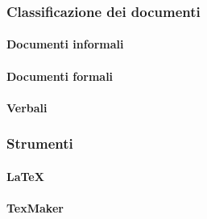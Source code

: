 \subsubsection{Classificazione dei documenti}
 \paragraph{Documenti informali}
 \paragraph{Documenti formali}
 \paragraph{Verbali}

\subsubsection{Strumenti}
 \paragraph{\LaTeX}
 \paragraph{TexMaker}
